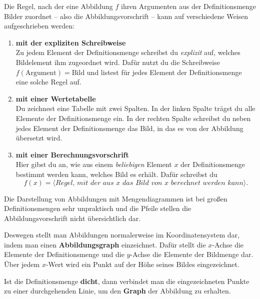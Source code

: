 \documentclass[solution]{uebungsblatt}
\begin{document}
\begin{remark}
Die Regel, nach der eine Abbildung $f$ ihren Argumenten aus der Definitionsmenge Bilder zuordnet -- also die Abbildungsvorschrift -- kann auf verschiedene Weisen aufgeschrieben werden:
\begin{enumerate}[label=\textbf{(\arabic*)}]
    \item \textbf{mit der expliziten Schreibweise}\\
        \sloppy
        Zu jedem Element der Definitionsmenge schreibst du \emph{explizit} auf, welches Bildelement ihm zugeordnet wird. Dafür nutzt du die Schreibweise \mbox{$f(\text{Argument})=\text{Bild}$} und listest für jedes Element der Definitionsmenge eine solche Regel auf.
    
        \fussy
    \item \textbf{mit einer Wertetabelle}\\
        Du zeichnest eine Tabelle mit zwei Spalten. In der linken Spalte trägst du alle Elemente der Definitionsmenge ein. In der rechten Spalte schreibst du neben jedes Element der Definitionsmenge das Bild, in das es von der Abbildung übersetzt wird.
    
    \item \textbf{mit einer Berechnungsvorschrift}\\
        Hier gibst du an, wie aus einem \emph{beliebigen} Element $x$ der Definitionsmenge bestimmt werden kann, welches Bild es erhält. Dafür schreibst du
        \[f(x)=\langle\textit{Regel, mit der aus $x$ das Bild von $x$ berechnet werden kann}\rangle.\]
\end{enumerate} 
\end{remark}

\begin{remark}

Die Darstellung von Abbildungen mit Mengendiagrammen ist bei großen Definitionsmengen sehr unpraktisch und die Pfeile stellen die Abbildungsvorschrift nicht übersichtlich dar.

Deswegen stellt man Abbildungen normalerweise im Koordinatensystem dar, indem man einen \textbf{Abbildungsgraph} einzeichnet. Dafür stellt die $x$-Achse die Elemente der Definitionsmenge und die $y$-Achse die Elemente der Bildmenge dar. Über jedem $x$-Wert wird ein Punkt auf der Höhe seines Bildes eingezeichnet. 

Ist die Definitionsmenge \textbf{dicht}, dann verbindet man die eingezeichneten Punkte zu einer durchgehenden Linie, um den \textbf{Graph} der Abbildung zu erhalten.
\end{remark}
\end{document}
